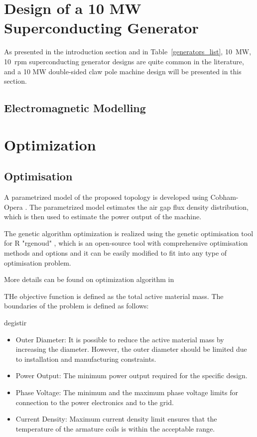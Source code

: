 \documentclass[12pt]{iopart}
\begin{document}
\section{Design of a 10 MW Superconducting Generator}
 
As presented in the introduction section and in Table~\ref{generators_list}, 10~MW, 10~rpm superconducting generator designs are quite common in the literature, and a 10 MW double-sided claw pole machine design will be presented in this section.
\subsection{Electromagnetic Modelling}



\section{Optimization}




\subsection{Optimisation}

A parametrized model of the proposed topology is developed using Cobham-Opera \cite{Opera}. The parametrized model estimates the air gap flux density distribution, which is then used to estimate the power output of the machine.

The genetic algorithm optimization is realized using the genetic optimisation tool for R "rgenoud" \cite{Mebane2011}, which is an open-source tool with comprehensive optimisation methods and options and it can be easily modified to fit into any type of optimisation problem.


More details can be found on optimization algorithm in \cite{github-repo}


THe objective function is defined as the total active material mass. The boundaries of the problem is defined as follows:

degistir

\begin{itemize}
  \item  Outer Diameter: It is possible to reduce the active material mass by increasing the diameter. However, the outer diameter should be limited due to installation and manufacturing constraints.
  \item Power Output: The minimum power output required for the specific design.
  \item Phase Voltage: The minimum and the maximum phase voltage limits for connection to the power electronics and to the grid.
  \item Current Density: Maximum current density limit ensures that the temperature of the armature coils is within the acceptable range.
\end{itemize}
\end{document}
